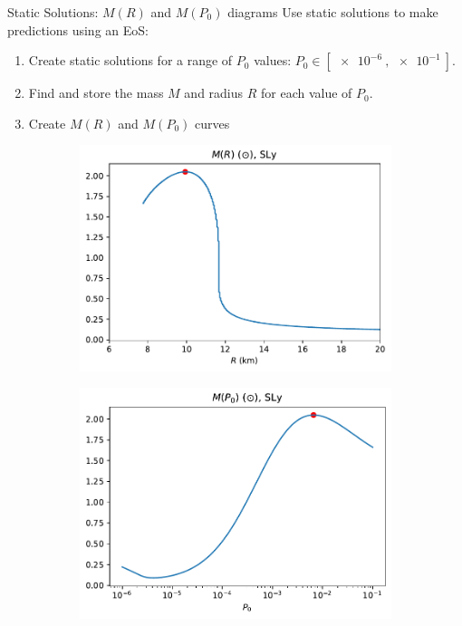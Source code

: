 \documentclass[handout]{beamer}
\begin{document}
    \begin{frame}{Static Solutions: $M(R)$ and $M(P_0)$ diagrams}
        \pause
        Use static solutions to make predictions using an EoS: \pause
        \begin{enumerate}
            \item Create static solutions for a range of $P_0$ values: \pause $P_0 \in [\SI{e-6}{}, \SI{e-1}{}].$\pause
            \item Find and store the mass $M$ and radius $R$ for each value of $P_0$.\pause
            \item Create $M(R)$ and $M(P_0)$ curves\pause
        \end{enumerate}

        \begin{figure}[h!]
            \centering
            \begin{subfigure}{.5\textwidth}
                \includegraphics[width = \textwidth]{../paper/images/tov/r_analysis,SLy.pdf}
            \end{subfigure}%
            \begin{subfigure}{.5\textwidth}
                \includegraphics[width = \textwidth]{../paper/images/tov/p0_analysis,SLy.pdf}

\end{subfigure}
\end{figure}
\end{frame}
\end{document}
